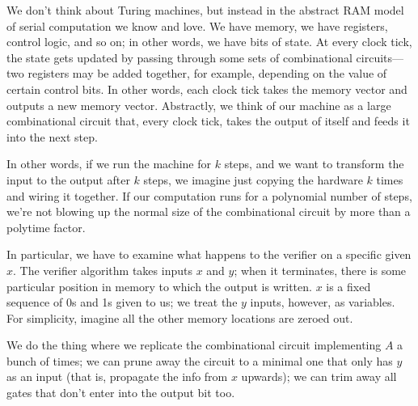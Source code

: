 \documentclass{article}
\begin{document}
We don't think about Turing machines, but instead in the abstract RAM model
of serial computation we know and love.
We have memory, we have registers, control logic, and so on; in other
words, we have bits of state.
At every clock tick, the state gets updated by passing through some sets of
combinational circuits---two registers may be added together, for example,
depending on the value of certain control bits.
In other words, each clock tick takes the memory vector and outputs a new
memory vector.
Abstractly, we think of our machine as a large combinational circuit that,
every clock tick, takes the output of itself and feeds it into the next
step.

In other words, if we run the machine for $k$ steps, and we want to transform
the input to the output after $k$ steps, we imagine just copying the hardware
$k$ times and wiring it together.
If our computation runs for a polynomial number of steps, we're not
blowing up the normal size of the combinational circuit by more than a
polytime factor.

In particular, we have to examine what happens to the verifier on a 
specific given $x$.
The verifier algorithm takes inputs $x$ and $y$; when it terminates, there
is some particular position in memory to which the output is written.
$x$ is a fixed sequence of 0s and 1s given to us; we treat the $y$ inputs,
however, as variables.
For simplicity, imagine all the other memory locations are zeroed out.

We do the thing where we replicate the combinational circuit implementing
$A$ a bunch of times; we can prune away the circuit to a minimal one
that only has $y$ as an input (that is, propagate the info from $x$ upwards);
we can trim away all gates that don't enter into the output bit too.
\end{document}
